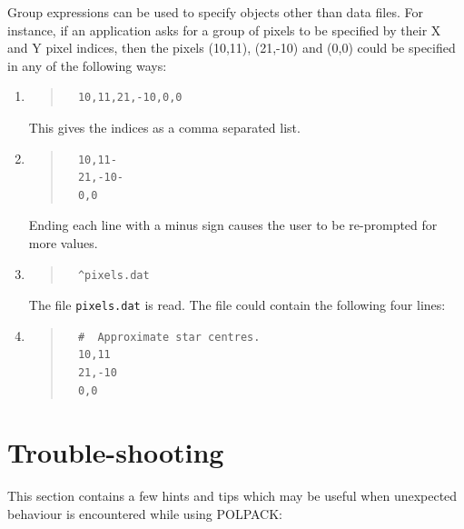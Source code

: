\documentclass[twoside,11pt]{article}
\newcommand{\xlabel}[1]{}
\renewcommand{\_}{\texttt{\symbol{95}}}
\newenvironment{myquote}{\begin{quote}\begin{small}}{\end{small}\end{quote}}
\begin{document}
Group expressions can be used to specify objects other than data files.
For instance,  if an application asks for a group of pixels to
be specified by  their X and Y pixel indices, then the pixels (10,11),
(21,-10) and (0,0) could be specified in any of the following ways:

\begin{enumerate}
\item 
\begin{myquote}
\begin{verbatim}
  10,11,21,-10,0,0  
\end{verbatim}
\end{myquote}
\vspace{3mm}
This gives the indices as a comma separated list.
\vspace{3mm}

\item 
\begin{myquote}
\begin{verbatim}
  10,11-
  21,-10-
  0,0
\end{verbatim}
\end{myquote}
\vspace{3mm}
Ending each line with a minus  sign causes the user to be re-prompted for more
values.
\vspace{3mm}

\item 
\begin{myquote}
\begin{verbatim}
  ^pixels.dat
\end{verbatim}
\end{myquote}
\vspace{3mm}
The file \verb+pixels.dat+ is read. The file could contain the  following four 
lines:

\item 
\begin{myquote}
\begin{verbatim}
  #  Approximate star centres.
  10,11
  21,-10
  0,0
\end{verbatim}
\end{myquote}
\end{enumerate}

\section{\label{SEC:TROUBLE}\xlabel{troubleshooting}Trouble-shooting}
This section contains a few hints and tips which may be useful when
unexpected behaviour is encountered while using POLPACK:
\end{document}
